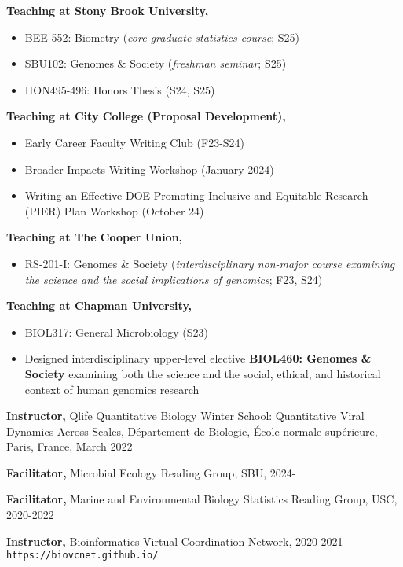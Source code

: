 \documentclass[]{res}
\begin{document}
\begin{resume}
{\bf Teaching at Stony Brook University,} 
\begin{itemize} \itemsep -2pt
\item BEE 552: Biometry (\emph{core graduate statistics course}; S25)
\item SBU102: Genomes \& Society (\emph{freshman seminar}; S25)
\item HON495-496: Honors Thesis (S24, S25)
\end{itemize}

{\bf Teaching at City College (Proposal Development),} 
\begin{itemize} \itemsep -2pt
\item Early Career Faculty Writing Club (F23-S24)
\item Broader Impacts Writing Workshop (January 2024)
\item Writing an Effective DOE Promoting Inclusive and Equitable Research (PIER) Plan Workshop (October 24)
\end{itemize}


{\bf Teaching at The Cooper Union,} 
\begin{itemize} \itemsep -2pt
\item RS-201-I: Genomes \& Society (\emph{interdisciplinary non-major course examining the science and the social implications of genomics}; F23, S24)
\end{itemize}

{\bf Teaching at Chapman University,} 
\begin{itemize} \itemsep -2pt
\item BIOL317: General Microbiology (S23)
\item Designed interdisciplinary upper-level elective {\bf BIOL460: Genomes \& Society} examining both the science and the social, ethical, and historical context of human genomics research
\end{itemize}

{\bf Instructor,} Qlife Quantitative Biology Winter School: Quantitative Viral Dynamics Across Scales, D\'{e}partement de Biologie, \'{E}cole normale sup\'{e}rieure, Paris, France, March 2022

{\bf Facilitator,} {Microbial Ecology Reading Group}, SBU, 2024-

{\bf Facilitator,} {Marine and Environmental Biology Statistics Reading Group}, USC, 2020-2022

{\bf Instructor,} Bioinformatics Virtual Coordination Network, 2020-2021\\
\verb|https://biovcnet.github.io/|


\end{resume}
\end{document}
